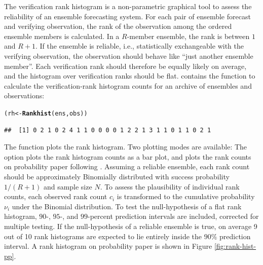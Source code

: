 \documentclass[article]{jss}\usepackage{graphicx, color}
\makeatletter
\newcommand{\hlfunctioncall}[1]{\textcolor[rgb]{0,0.501960784313725,0.752941176470588}{\textbf{#1}}}%
\newenvironment{kframe}{%
 \def\at@end@of@kframe{}%
 \ifinner\ifhmode%
  \def\at@end@of@kframe{\end{minipage}}%
  \begin{minipage}{\columnwidth}%
 \fi\fi%
 \def\FrameCommand##1{\hskip\@totalleftmargin \hskip-\fboxsep
 \colorbox{shadecolor}{##1}\hskip-\fboxsep
     \hskip-\linewidth \hskip-\@totalleftmargin \hskip\columnwidth}%
 \MakeFramed {\advance\hsize-\width
   \@totalleftmargin\z@ \linewidth\hsize
   \@setminipage}}%
 {\par\unskip\endMakeFramed%
 \at@end@of@kframe}
\newenvironment{knitrout}{}{} %
\makeatother
\begin{document}
The verification rank histogram \citep{talagrand1997evaluation,hamill2001interpretation} is a non-parametric graphical tool to assess the reliability of an ensemble forecasting system.
For each pair of ensemble forecast and verifying observation, the rank of the observation among the ordered ensemble members is calculated.
In a $R$-member ensemble, the rank is between $1$ and $R+1$.
If the ensemble is reliable, i.e., statistically exchangeable with the verifying observation, the observation should behave like ``just another ensemble member''. 
Each verification rank should therefore be equally likely on average, and the histogram over verification ranks should be flat. 
 contains the function  to calculate the verification-rank histogram counts for an archive of ensembles and observations:
%
\begin{knitrout}
\color{fgcolor}\begin{kframe}
\begin{alltt}
(rh <- \hlfunctioncall{Rankhist}(ens, obs))
\end{alltt}
\begin{verbatim}
##  [1] 0 2 1 0 2 4 1 1 0 0 0 0 1 2 2 1 3 1 1 0 1 1 0 2 1
\end{verbatim}
\end{kframe}
\end{knitrout}



The function  plots the rank histogram.
Two plotting modes are available:
The option  plots the rank histogram counts as a bar plot, and  plots the rank counts on probability paper following \citet{broecker2008reliability}. 
Assuming a reliable ensemble, each rank count should be approximately Binomially distributed with success probability $1/(R+1)$ and sample size $N$.
To assess the plausibility of individual rank counts, each observed rank count $c_i$ is transformed to the cumulative probability $\nu_i$ under the Binomial distribution.
To test the null-hypothesis of a flat rank histogram, $90$-, $95$-, and $99$-percent prediction intervals are included, corrected for multiple testing.
If the null-hypothesis of a reliable ensemble is true, on average 9 out of 10 rank histograms are expected to lie entirely inside the $90\%$ prediction interval.
A rank histogram on probability paper is shown in Figure \ref{fig:rank-hist-pp}. 
\end{document}
